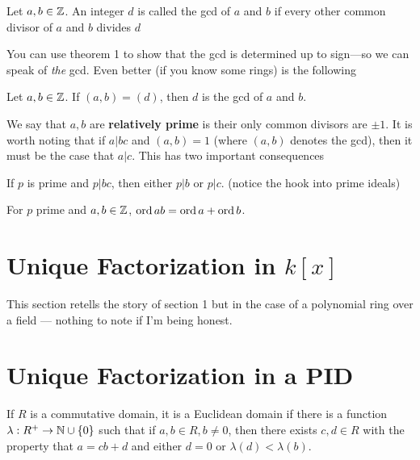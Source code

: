 \begin{definition}[GCD]
  \label{def:gcd}
  Let \(a,b \in \mathbb{Z} \). An integer \(d\) is called the gcd of \(a\) and \(b\) if
  every other common divisor of \(a\) and \(b\) divides \(d\)
\end{definition}

You can use theorem 1 to show that the gcd is determined up to sign---so we can
speak of \emph{the} gcd. Even better (if you know some rings) is the following

\begin{lemma}
  Let \(a,b \in \mathbb{Z} \). If \((a,b) = (d)\), then \(d\) is the gcd of \(a\) and \(b\).
\end{lemma}

We say that \(a,b\) are \textbf{relatively prime} is their only common divisors
are \(\pm 1\). It is worth noting that if \(a | bc\) and \((a,b) = 1\) (where
\((a,b)\) denotes the gcd), then it must be the case that \(a|c\). This has two
important consequences

\begin{corollary}
  If \(p\) is prime and \(p | bc\), then either \(p| b\) or \(p | c\). (notice
  the hook into prime ideals)
\end{corollary}

\begin{corollary}
  For \(p\) prime and \(a,b \in \mathbb{Z} \), \(\operatorname{ord} ab = \operatorname{ord} a + \operatorname{ord} b\).
\end{corollary}

\section{Unique Factorization in \(k[x]\)}%
\label{sec:1.2}

This section retells the story of section 1 but in the case of a polynomial ring
over a field --- nothing to note if I'm being honest.

\section{Unique Factorization in a PID}%
\label{sec:1.2}

\begin{definition}
  \label{def:Edom}
  If \(R\) is a commutative domain, it is a Euclidean domain if there is a
  function \(\lambda: R^+ \to \mathbb{N} \cup \{0\} \) such that if
  \(a,b \in R, b \neq 0\), then there exists \(c,d \in R\) with the property
  that \(a=cb+d\) and either \(d=0\) or \(\lambda(d) < \lambda(b)\).
\end{definition}

